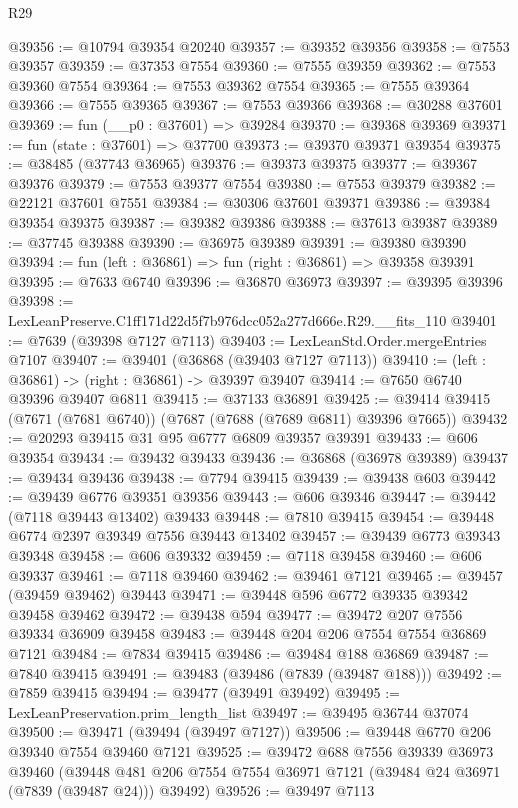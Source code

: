 \begin{lexlean}{R29}
\begin{coremodule}
@39356 := @10794 @39354 @20240
@39357 := @39352 @39356
@39358 := @7553 @39357
@39359 := @37353 @7554
@39360 := @7555 @39359
@39362 := @7553 @39360 @7554
@39364 := @7553 @39362 @7554
@39365 := @7555 @39364
@39366 := @7555 @39365
@39367 := @7553 @39366
@39368 := @30288 @37601
@39369 := fun (__p0 : @37601) => @39284
@39370 := @39368 @39369
@39371 := fun (state : @37601) => @37700
@39373 := @39370 @39371 @39354
@39375 := @38485 (@37743 @36965)
@39376 := @39373 @39375
@39377 := @39367 @39376
@39379 := @7553 @39377 @7554
@39380 := @7553 @39379
@39382 := @22121 @37601 @7551
@39384 := @30306 @37601 @39371
@39386 := @39384 @39354 @39375
@39387 := @39382 @39386
@39388 := @37613 @39387
@39389 := @37745 @39388
@39390 := @36975 @39389
@39391 := @39380 @39390
@39394 := fun (left : @36861) => fun (right : @36861) => @39358 @39391
@39395 := @7633 @6740
@39396 := @36870 @36973
@39397 := @39395 @39396
@39398 := LexLeanPreserve.C1ff171d22d5f7b976dcc052a277d666e.R29.__fits_110
@39401 := @7639 (@39398 @7127 @7113)
@39403 := LexLeanStd.Order.mergeEntries @7107
@39407 := @39401 (@36868 (@39403 @7127 @7113))
@39410 := (left : @36861) -> (right : @36861) -> @39397 @39407
@39414 := @7650 @6740 @39396 @39407 @6811
@39415 := @37133 @36891
@39425 := @39414 @39415 (@7671 (@7681 @6740)) (@7687 (@7688 (@7689 @6811) @39396 @7665))
@39432 := @20293 @39415 @31 @95 @6777 @6809 @39357 @39391
@39433 := @606 @39354
@39434 := @39432 @39433
@39436 := @36868 (@36978 @39389)
@39437 := @39434 @39436
@39438 := @7794 @39415
@39439 := @39438 @603
@39442 := @39439 @6776 @39351 @39356
@39443 := @606 @39346
@39447 := @39442 (@7118 @39443 @13402) @39433
@39448 := @7810 @39415
@39454 := @39448 @6774 @2397 @39349 @7556 @39443 @13402
@39457 := @39439 @6773 @39343 @39348
@39458 := @606 @39332
@39459 := @7118 @39458
@39460 := @606 @39337
@39461 := @7118 @39460
@39462 := @39461 @7121
@39465 := @39457 (@39459 @39462) @39443
@39471 := @39448 @596 @6772 @39335 @39342 @39458 @39462
@39472 := @39438 @594
@39477 := @39472 @207 @7556 @39334 @36909 @39458
@39483 := @39448 @204 @206 @7554 @7554 @36869 @7121
@39484 := @7834 @39415
@39486 := @39484 @188 @36869
@39487 := @7840 @39415
@39491 := @39483 (@39486 (@7839 (@39487 @188)))
@39492 := @7859 @39415
@39494 := @39477 (@39491 @39492)
@39495 := LexLeanPreservation.prim_length_list
@39497 := @39495 @36744 @37074
@39500 := @39471 (@39494 (@39497 @7127))
@39506 := @39448 @6770 @206 @39340 @7554 @39460 @7121
@39525 := @39472
    @688
    @7556
    @39339
    @36973
    @39460
    (@39448 @481 @206 @7554 @7554 @36971 @7121 (@39484 @24 @36971 (@7839 (@39487 @24))) @39492)
@39526 := @39497 @7113

\end{coremodule}
\end{lexlean}
